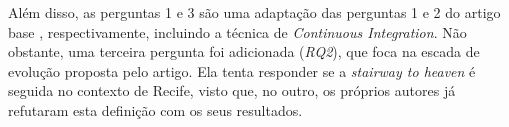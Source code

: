 Além disso, as perguntas 1 e 3 são uma adaptação das perguntas 1 e 2 do artigo base \cite{empiricalStudy2016}, respectivamente, incluindo a técnica de \emph{Continuous Integration}. Não obstante, uma terceira pergunta foi adicionada (\emph{RQ2}), que foca na escada de evolução proposta pelo artigo. Ela tenta responder se a \emph{stairway to heaven} é seguida no contexto de Recife, visto que, no outro, os próprios autores já refutaram esta definição com os seus resultados.


